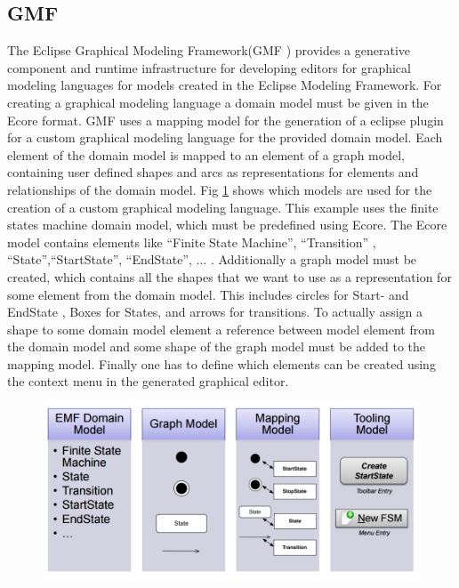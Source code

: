 \documentclass[runningheads,a4paper]{llncs}
\begin{document}
    \subsection{GMF}
    The Eclipse Graphical Modeling Framework(GMF \cite{gmf}) provides a generative component and runtime infrastructure for developing 
    editors for graphical modeling languages for models created in the Eclipse Modeling Framework.
    For creating a graphical modeling language a domain model must be given in the Ecore format.
    GMF uses a mapping model for the generation of a eclipse plugin for a custom graphical modeling language for the provided domain model. 
    Each element of the domain model is mapped to an element of a graph model, containing user defined shapes and arcs as representations for elements 
    and relationships of the domain model. Fig \ref{mapmodel} shows which models are used for the creation of a custom graphical modeling language.
    This example uses the finite states machine domain model, which must be predefined using Ecore. 
    The Ecore model contains elements like ``Finite State Machine'', ``Transition'' , ``State'',``StartState'', ``EndState'', ... .
    Additionally a graph model must be created, which contains all the shapes that we want to 
    use as a representation for some element from the domain model. This includes circles for Start- and EndState , Boxes for States,
    and arrows for transitions. To actually assign a shape to some domain model element a reference between model element from the domain model 
    and some shape of the graph model must be added to the mapping model. Finally one has to define which elements can be created using the context 
    menu in the generated graphical editor.

    \begin{figure}[ht]
      \centering
      \includegraphics[width=\textwidth]{images/TableGMFSteps.PNG}
      \label{mapmodel}
    \end{figure}
    
\end{document}
